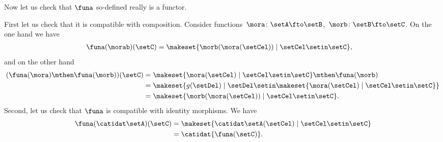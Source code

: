 \begin{example}
    Now let us check that $\funa$ so-defined really is a functor.

    First let us check that it is compatible with composition.
    Consider functions~$\mora\colon \setA\fto \setB$,~$\morb\colon \setB \fto \setC$.
    On the one hand we have
    \begin{equation}\label{eq:powerset-functor-example-3}
        \begin{aligned}
            \funa(\morab)(\setC) & =\makeset{ \morb(\mora(\setCel))\mid \setCel \setin \setC},
        \end{aligned}
    \end{equation}
    and on the other hand
    \begin{equation}\label{eq:powerset-functor-example-4}
        \begin{aligned}
            (\funa(\mora)\mthen \funa(\morb))(\setC)
             & =\makeset{ \mora(\setCel) \mid \setCel \setin \setC}\mthen \funa(\morb) \\
             & =\makeset{g(\setDel)\mid \setDel \setin \makeset{\mora(\setCel)\mid \setCel\setin \setC}} \\
             & =\makeset{ \morb(\mora(\setCel))\mid \setCel \setin \setC}.
        \end{aligned}
    \end{equation}
    Second, let us check that $\funa$ is compatible with identity morphisms.
    We have
    \begin{equation}\label{eq:powerset-functor-example-5}
        \begin{aligned}
            \funa(\catidat\setA)(\setC) & = \makeset{\catidat\setA(\setCel)\mid \setCel \setin \setC} \\
                                        & =\catidat{\funa(\setC)}.
        \end{aligned}
    \end{equation}
\end{example}

